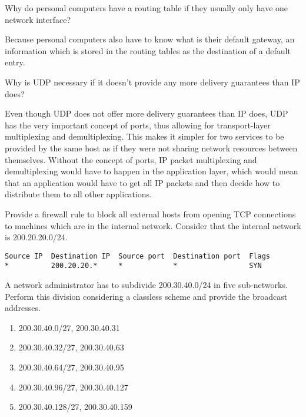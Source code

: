 \begin{Exercise}
Why do personal computers have a routing table if they usually only have one network interface?
\end{Exercise}
\begin{Answer}
Because personal computers also have to know what is their default gateway, an information which is stored in the routing tables as the destination of a default entry.
\end{Answer}

\begin{Exercise}
Why is UDP necessary if it doesn't provide any more delivery guarantees than IP does?
\end{Exercise}
\begin{Answer}
Even though UDP does not offer more delivery guarantees than IP does, UDP has the very important concept of ports, thus allowing for transport-layer multiplexing and demultiplexing.
This makes it simpler for two services to be provided by the same host as if they were not sharing network resources between themselves.
Without the concept of ports, IP packet multiplexing and demultiplexing would have to happen in the application layer, which would mean that an application would have to get all IP packets and then decide how to distribute them to all other applications.
\end{Answer}

\begin{Exercise}
Provide a firewall rule to block all external hosts from opening TCP connections to machines which are in the internal network.
Consider that the internal network is 200.20.20.0/24.
\end{Exercise}
\begin{Answer}
\begin{verbatim}
Source IP  Destination IP  Source port  Destination port  Flags
*          200.20.20.*     *            *                 SYN
\end{verbatim}
\end{Answer}

\begin{Exercise}
A network administrator has to subdivide 200.30.40.0/24 in five sub-networks.
Perform this division considering a classless scheme and provide the broadcast addresses.
\end{Exercise}
\begin{Answer}
\begin{enumerate}
\item 200.30.40.0/27, 200.30.40.31
\item 200.30.40.32/27, 200.30.40.63
\item 200.30.40.64/27, 200.30.40.95
\item 200.30.40.96/27, 200.30.40.127
\item 200.30.40.128/27, 200.30.40.159
\end{enumerate}
\end{Answer}

